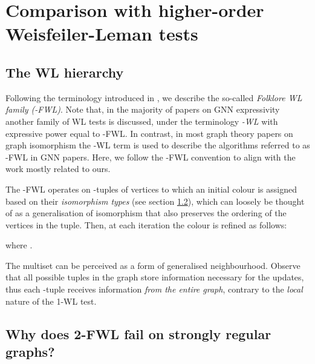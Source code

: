 \section{Comparison with higher-order Weisfeiler-Leman tests}\label{k-wl-comparison}

\subsection{The WL hierarchy}\label{k-wl}

Following the terminology introduced in \cite{maron2019provably}, we describe the so-called {\em Folklore WL family (-FWL)}. Note that, in the majority of papers on GNN expressivity \cite{morris2019weisfeiler, maron2019provably, chen2020can} another family of WL tests is discussed, under the terminology \textit{-WL} with expressive power equal to -FWL. In contrast, in most graph theory papers on graph isomorphism \cite{DBLP:journals/combinatorica/CaiFI92, furer2017combinatorial, DBLP:conf/fct/ArvindFKV19} the -WL term is used to describe the algorithms referred to as -FWL in GNN papers. Here, we follow the -FWL convention to align with the work mostly related to ours.

The -FWL operates on -tuples of vertices  to which an initial colour  is assigned based on their \textit{isomorphism types} (see section \ref{sr_graphs_wl}), which can loosely be thought of as a generalisation of isomorphism that also preserves the ordering of the vertices in the tuple. Then, at each iteration the colour is refined as follows:

where . 

The multiset  can be perceived as a form of generalised neighbourhood. Observe that all possible tuples in the graph store information necessary for the updates, thus each -tuple receives information {\em from the entire graph}, contrary to the {\em local} nature of the 1-WL test. 


\subsection{Why does 2-FWL fail on strongly regular graphs?}\label{sr_graphs_wl}

